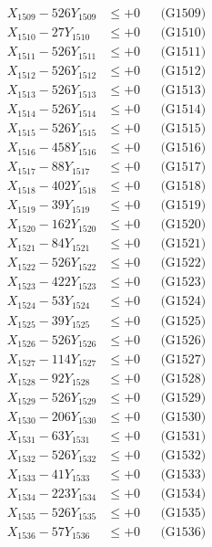 \documentclass[a4paper,10pt]{article}
\begin{document}
{\begin{align}
X_{1509} - 526Y_{1509} &\leq +0 && \text{(G1509)} \\
X_{1510} - 27Y_{1510} &\leq +0 && \text{(G1510)} \\
\allowbreak
X_{1511} - 526Y_{1511} &\leq +0 && \text{(G1511)} \\
X_{1512} - 526Y_{1512} &\leq +0 && \text{(G1512)} \\
X_{1513} - 526Y_{1513} &\leq +0 && \text{(G1513)} \\
X_{1514} - 526Y_{1514} &\leq +0 && \text{(G1514)} \\
X_{1515} - 526Y_{1515} &\leq +0 && \text{(G1515)} \\
X_{1516} - 458Y_{1516} &\leq +0 && \text{(G1516)} \\
X_{1517} - 88Y_{1517} &\leq +0 && \text{(G1517)} \\
X_{1518} - 402Y_{1518} &\leq +0 && \text{(G1518)} \\
X_{1519} - 39Y_{1519} &\leq +0 && \text{(G1519)} \\
X_{1520} - 162Y_{1520} &\leq +0 && \text{(G1520)} \\
\allowbreak
X_{1521} - 84Y_{1521} &\leq +0 && \text{(G1521)} \\
X_{1522} - 526Y_{1522} &\leq +0 && \text{(G1522)} \\
X_{1523} - 422Y_{1523} &\leq +0 && \text{(G1523)} \\
X_{1524} - 53Y_{1524} &\leq +0 && \text{(G1524)} \\
X_{1525} - 39Y_{1525} &\leq +0 && \text{(G1525)} \\
X_{1526} - 526Y_{1526} &\leq +0 && \text{(G1526)} \\
X_{1527} - 114Y_{1527} &\leq +0 && \text{(G1527)} \\
X_{1528} - 92Y_{1528} &\leq +0 && \text{(G1528)} \\
X_{1529} - 526Y_{1529} &\leq +0 && \text{(G1529)} \\
X_{1530} - 206Y_{1530} &\leq +0 && \text{(G1530)} \\
\allowbreak
X_{1531} - 63Y_{1531} &\leq +0 && \text{(G1531)} \\
X_{1532} - 526Y_{1532} &\leq +0 && \text{(G1532)} \\
X_{1533} - 41Y_{1533} &\leq +0 && \text{(G1533)} \\
X_{1534} - 223Y_{1534} &\leq +0 && \text{(G1534)} \\
X_{1535} - 526Y_{1535} &\leq +0 && \text{(G1535)} \\
X_{1536} - 57Y_{1536} &\leq +0 && \text{(G1536)} \\

\end{align}}
\end{document}
